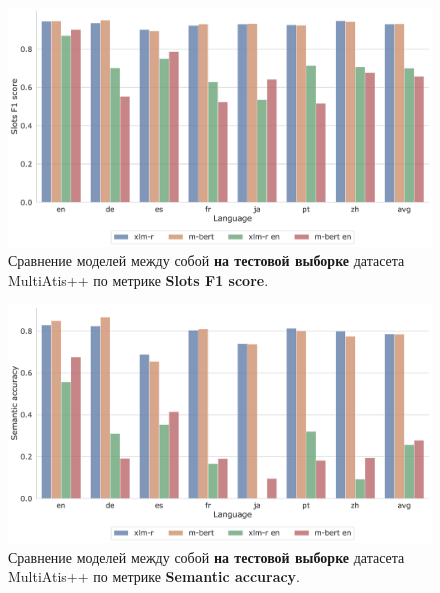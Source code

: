 \begin{figure}[H]
    \centering
    \includegraphics[width=\textwidth]{images/1}
    \caption{Сравнение моделей между собой \textbf{на тестовой выборке} датасета MultiAtis++ по метрике \textbf{Slots F1 score}.}\label{fig:figure1}
\end{figure}
\begin{figure}[H]
    \centering
    \includegraphics[width=\textwidth]{images/2}
    \caption{Сравнение моделей между собой \textbf{на тестовой выборке} датасета MultiAtis++ по метрике \textbf{Semantic accuracy}.}\label{fig:figure2}
\end{figure}

